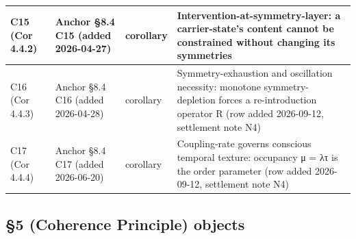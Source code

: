 \documentclass[11pt, openany]{book}
\begin{document}
\begin{longtable}{p{0.53in} p{0.61in} p{0.53in} p{2.61in}}
\midrule
C15 (Cor 4.4.2) & Anchor §8.4 C15 (added 2026-04-27) & corollary & Intervention-at-symmetry-layer: a carrier-state's content cannot be constrained without changing its symmetries \\
\midrule
C16 (Cor 4.4.3) & Anchor §8.4 C16 (added 2026-04-28) & corollary & Symmetry-exhaustion and oscillation necessity: monotone symmetry-depletion forces a re-introduction operator R (row added 2026-09-12, settlement note N4) \\
\midrule
C17 (Cor 4.4.4) & Anchor §8.4 C17 (added 2026-06-20) & corollary & Coupling-rate governs conscious temporal texture: occupancy μ = λτ is the order parameter (row added 2026-09-12, settlement note N4) \\
\bottomrule
\end{longtable}
\endgroup
\subsection{§5 (Coherence Principle) objects}
\end{document}
